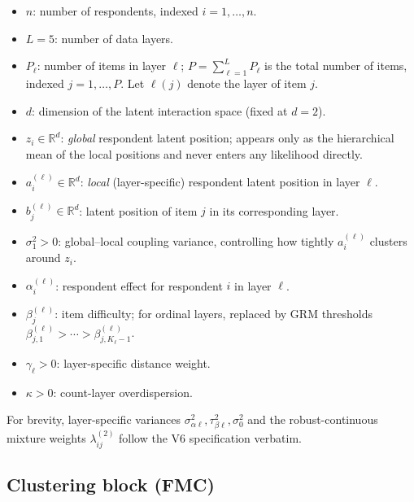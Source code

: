 \documentclass[11pt]{article}
\begin{document}
\begin{itemize}[leftmargin=1.5em]
    \item $n$: number of respondents, indexed $i=1,\dots,n$.
    \item $L=5$: number of data layers.
    \item $P_\ell$: number of items in layer $\ell$; $P=\sum_{\ell=1}^L P_\ell$ is the total number of items, indexed $j=1,\dots,P$. Let $\ell(j)$ denote the layer of item $j$.
    \item $d$: dimension of the latent interaction space (fixed at $d=2$).
    \item $z_i \in \mathbb{R}^d$: \emph{global} respondent latent position; appears only as the hierarchical mean of the local positions and never enters any likelihood directly.
    \item $a_i^{(\ell)} \in \mathbb{R}^d$: \emph{local} (layer-specific) respondent latent position in layer $\ell$.
    \item $b_j^{(\ell)} \in \mathbb{R}^d$: latent position of item $j$ in its corresponding layer.
    \item $\sigma_1^2 > 0$: global--local coupling variance, controlling how tightly $a_i^{(\ell)}$ clusters around $z_i$.
    \item $\alpha_i^{(\ell)}$: respondent effect for respondent $i$ in layer $\ell$.
    \item $\beta_j^{(\ell)}$: item difficulty; for ordinal layers, replaced by GRM thresholds $\beta_{j,1}^{(\ell)}>\cdots>\beta_{j,K_\ell-1}^{(\ell)}$.
    \item $\gamma_\ell>0$: layer-specific distance weight.
    \item $\kappa>0$: count-layer overdispersion.
\end{itemize}

For brevity, layer-specific variances $\sigma_{\alpha\ell}^2,\tau_{\beta\ell}^2,\sigma_0^2$ and the robust-continuous mixture weights $\lambda_{ij}^{(2)}$ follow the V6 specification verbatim.

\subsection*{Clustering block (FMC)}
\end{document}
